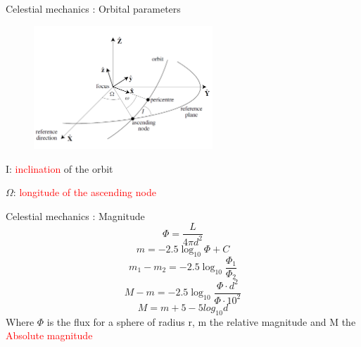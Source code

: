 \documentclass{beamer}
\begin{document}
\begin{frame}{Celestial mechanics \cite{murray1999solar}: Orbital parameters}

\begin{figure}[h]
\begin{center}
\includegraphics[width=0.6\textwidth ]{Pic/Inclination.png}
\caption{\cite{murray1999solar}}
\label{Area_dynamics}
\end{center}
\end{figure}

\begin{center}
I: \textcolor{red}{inclination} of the orbit
\end{center}
\begin{center}
$\Omega$: \textcolor{red}{longitude of the ascending node}
\end{center}
\end{frame}

\begin{frame}{Celestial mechanics \cite{murray1999solar}: Magnitude}
\begin{equation}
\Phi=\frac{L}{4\pi d^{2}}
\end{equation}
\begin{equation}
m=-2.5\log_{10}\Phi+C
\end{equation}
\begin{equation}
m_{1}-m_{2}=-2.5\log_{10}\frac{\Phi_{1}}{\Phi_{2}}
\end{equation}
\begin{equation}
M-m=-2.5\log_{10}\frac{\Phi\cdot d^{2} }{\Phi\cdot 10^{2}}
\end{equation}
\begin{equation}
M=m+5-5log_{10}d
\end{equation}
Where $\Phi$ is the flux for a sphere of radius r, m the relative magnitude and M the \textcolor{red}{Absolute magnitude}
\end{frame}
\end{document}
